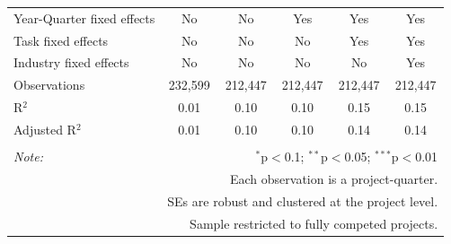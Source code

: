 \documentclass[
]{article}
\begin{document}
\begin{table}[H]
\begin{tabular}{@{\extracolsep{-2pt}}lccccc}
Year-Quarter fixed effects & No & No & Yes & Yes & Yes \\ 
Task fixed effects & No & No & No & Yes & Yes \\ 
Industry fixed effects & No & No & No & No & Yes \\ 
Observations & 232,599 & 212,447 & 212,447 & 212,447 & 212,447 \\ 
R$^{2}$ & 0.01 & 0.10 & 0.10 & 0.15 & 0.15 \\ 
Adjusted R$^{2}$ & 0.01 & 0.10 & 0.10 & 0.14 & 0.14 \\ 
\hline 
\hline \\[-1.8ex] 
\textit{Note:}  & \multicolumn{5}{r}{$^{*}$p$<$0.1; $^{**}$p$<$0.05; $^{***}$p$<$0.01} \\ 
 & \multicolumn{5}{r}{Each observation is a project-quarter.} \\ 
 & \multicolumn{5}{r}{SEs are robust and clustered at the project level.} \\ 
 & \multicolumn{5}{r}{Sample restricted to fully competed projects.} \\ 
\end{tabular} 
\end{table}
\end{document}
